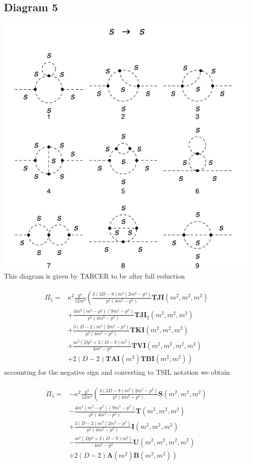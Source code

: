 \documentclass[11pt]{article}
\begin{document}
\subsection*{Diagram 5}
\begin{center}
\includegraphics{2loop_5.pdf}
This diagram is given by TARCER to be after full reduction

\end{center}
\begin{align}
\begin{split}
\Pi_5 =& \kappa^2 \frac{g^4}{12 m^4} \left( \frac{3(3D-8)m^2(2m^2-p^2)}{p^2(4m^2-p^2)}\mathbf{TJI}(m^2,m^2,m^2)\right. \\
&+ \frac{4m^2(m^2-p^2)(9m^2-p^2)}{p^2(4m^2-p^2)}\mathbf{TJI}_2(m^2,m^2,m^2)\\
&+\frac{3(D-2)m^2(2m^2-p^2)}{p^2(4m^2-p^2)}\mathbf{TKI}(m^2,m^2,m^2)\\
&+\frac{m^2(D p^2+2(D-9)m^2)}{4m^2-p^2}\mathbf{TVI}(m^2,m^2,m^2,m^2)\\
&\left.+2(D-2)\mathbf{TAI}(m^2) \mathbf{TBI}(m^2,m^2) \right)
\end{split}
\end{align}
accounting for the negative sign and converting to TSIL notation we obtain

\begin{align}
\begin{split}
\Pi_5 =& - \kappa^2 \frac{g^4}{12 m^4} \left( \frac{3(3D-8)m^2(2m^2-p^2)}{p^2(4m^2-p^2)}\mathbf{S}(m^2,m^2,m^2)\right. \\
&-\frac{4m^2(m^2-p^2)(9m^2-p^2)}{p^2(4m^2-p^2)}\mathbf{T}(m^2,m^2,m^2)\\
&+\frac{3(D-2)m^2(2m^2-p^2)}{p^2(4m^2-p^2)}\mathbf{I}(m^2,m^2,m^2)\\
&-\frac{m^2(D p^2+2(D-9)m^2)}{4m^2-p^2}\mathbf{U}(m^2,m^2,m^2,m^2)\\
&\left.+2(D-2)\mathbf{A}(m^2) \mathbf{B}(m^2,m^2) \right)
\end{split}
\end{align}
\end{document}
